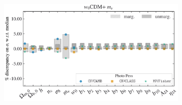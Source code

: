 \documentclass[oneside]{book}
\begin{document}
\begin{figure}
\begin{subfigure}[b]{0.49\textwidth}
    \end{subfigure}
    \hfill
    \begin{subfigure}[b]{0.49\textwidth}
        \centering
        \includegraphics[width=\textwidth]{Photo_Pess_mnu+w0_error_comparison.pdf}
    \end{subfigure}    
       \label{fig:Comparison_w0M} 
\end{figure}
\end{document}
